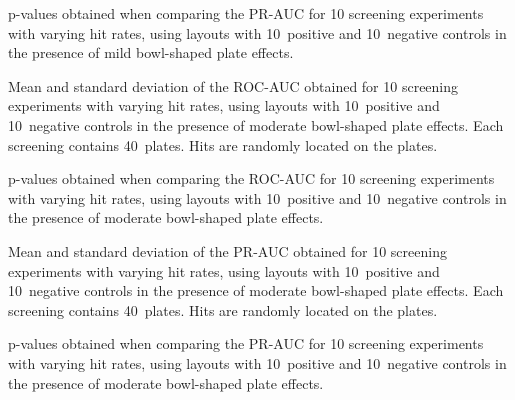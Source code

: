 \begin{table}[p]
    \centering
    \small
    
    \caption{p-values obtained when comparing the PR-AUC for 10 screening experiments with varying hit rates, using layouts with 10~positive and 10~negative controls in the presence of mild bowl-shaped plate effects.}
    \label{tab:screening-pr_pvalues-10-10-0.06}
\end{table}

\clearpage
\begin{table}[p]
    \centering
    \small
    
    \caption{Mean and standard deviation of the ROC-AUC obtained for 10 screening experiments with varying hit rates, using layouts with 10~positive and 10~negative controls in the presence of moderate bowl-shaped plate effects. Each screening contains 40~plates. Hits are randomly located on the plates.}
    \label{tab:screening-roc_10-10-0.1}
\end{table}

\begin{table}[p]
    \centering
    \small
    
    \caption{p-values obtained when comparing the ROC-AUC for 10 screening experiments with varying hit rates, using layouts with 10~positive and 10~negative controls in the presence of moderate bowl-shaped plate effects.}
    \label{tab:screening-roc_pvalues-10-10-0.1}
\end{table}

\begin{table}[p]
    \centering
    \small
    
    \caption{Mean and standard deviation of the PR-AUC obtained for 10 screening experiments with varying hit rates, using layouts with 10~positive and 10~negative controls in the presence of moderate bowl-shaped plate effects. Each screening contains 40~plates. Hits are randomly located on the plates.}
    \label{tab:screening-pr_10-10-0.1}
\end{table}

\begin{table}[p]
    \centering
    \small
    
    \caption{p-values obtained when comparing the PR-AUC for 10 screening experiments with varying hit rates, using layouts with 10~positive and 10~negative controls in the presence of moderate bowl-shaped plate effects.}
    \label{tab:screening-pr_pvalues-10-10-0.1}
\end{table}

